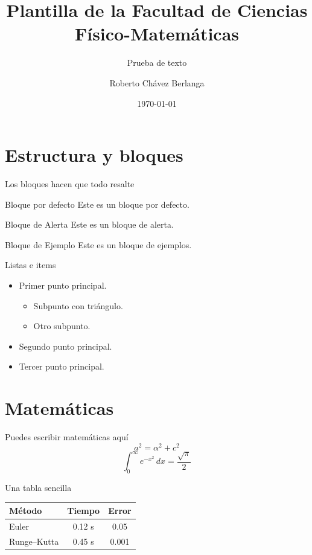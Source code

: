 \documentclass[aspectratio=169]{beamer}
\title[Plantilla FCFM]{Plantilla de la Facultad de Ciencias Físico-Matemáticas}
\subtitle{Prueba de texto}
\date{\today}
\author[R. Chávez B.]{Roberto Chávez Berlanga}
\institute[UAdeC]{Universidad Autónoma de Coahuila}
\begin{document}
	
	\begin{frame}
		\titlepage
	\end{frame}
	
	\section{Estructura y bloques}
	
	\begin{frame}{Los bloques hacen que todo resalte}
		\begin{block}{Bloque por defecto}
			Este es un bloque por defecto.
		\end{block}
		\begin{alertblock}{Bloque de Alerta}
			Este es un bloque de alerta.
		\end{alertblock}
		\begin{exampleblock}{Bloque de Ejemplo}
			Este es un bloque de ejemplos.
		\end{exampleblock}
	\end{frame}
	
	\begin{frame}{Listas e items}
		\begin{itemize}
			\item Primer punto principal.
			\begin{itemize}
				\item Subpunto con triángulo.
				\item Otro subpunto.
			\end{itemize}
			\item Segundo punto principal.
			\item Tercer punto principal.
		\end{itemize}
	\end{frame}
	
	\section{Matemáticas}
	
	\begin{frame}{Puedes escribir matemáticas aquí}
		\begin{equation}
			a^2 = \alpha^2 + c^2
		\end{equation}
		\begin{equation}
			\int_{0}^{\infty} e^{-x^2}\, dx = \frac{\sqrt{\pi}}{2}
		\end{equation}
	\end{frame}
	
	\begin{frame}{Una tabla sencilla}
		\begin{center}
			\begin{tabular}{lcc}
				\toprule
				Método & Tiempo & Error \\
				\midrule
				Euler        & 0.12 s & 0.05 \\
				Runge--Kutta & 0.45 s & 0.001 \\
				\bottomrule
			\end{tabular}
		\end{center}
	\end{frame}
	
\end{document}
